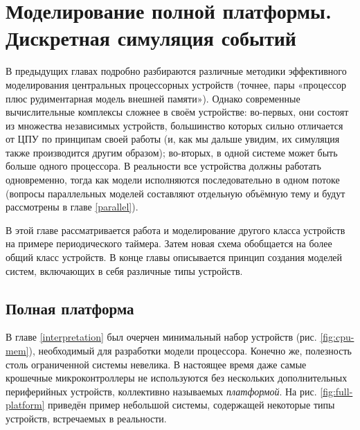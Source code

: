 
\chapter[Моделирование полной платформы]{Моделирование полной платформы. Дискретная симуляция событий}\label{fullplatform}


В предыдущих главах подробно разбираются различные методики эффективного моделирования центральных процессорных устройств (точнее, пары «процессор плюс рудиментарная модель внешней памяти»). Однако современные вычислительные комплексы сложнее в своём устройстве: во-первых, они  состоят из множества независимых устройств, большинство которых сильно отличается от ЦПУ по принципам своей работы (и, как мы дальше увидим, их симуляция также производится  другим образом); во-вторых, в одной системе может быть больше одного процессора. В реальности все устройства должны работать одновременно, тогда как модели исполняются последовательно в одном потоке (вопросы параллельных моделей составляют отдельную объёмную тему и будут рассмотрены в главе \ref{parallel}).

В этой главе рассматривается работа и моделирование другого класса устройств на примере периодического таймера. Затем новая схема обобщается на более общий класс устройств. В конце главы описывается принцип создания моделей систем, включающих в себя различные типы устройств.

\section{Полная платформа}

В главе \ref{interpretation} был очерчен минимальный набор устройств (рис. \ref{fig:cpu-mem}), необходимый для разработки модели процессора. Конечно же, полезность столь ограниченной системы невелика. В настоящее время даже самые крошечные микроконтроллеры не используются без нескольких дополнительных периферийных устройств, коллективно называемых \textit{платформой}. На рис. \ref{fig:full-platform} приведён пример небольшой системы, содержащей некоторые типы устройств, встречаемых в реальности.

